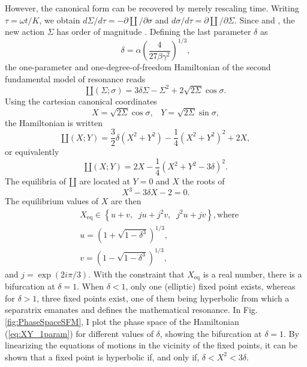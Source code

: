 \documentclass[12pt,a4paper,oneside]{article}
\begin{document}
However, the canonical form can be recovered by merely rescaling time. Writing $\tau=\omega t/K$, we obtain $d\Sigma/d\tau=-\partial\amalg/\partial\sigma$ and $d\sigma/d\tau=\partial\amalg/\partial\Sigma$. Since  and , the new action $\Sigma$ has order of magnitude . Defining the last parameter $\delta$ as
\begin{equation}
	\delta=\alpha\left(\frac{4}{27\beta\gamma^2}\right)^{1/3},
\end{equation}
the one-parameter and one-degree-of-freedom Hamiltonian of the second fundamental model of resonance reads
\begin{equation}\label{eq:SFM_polar}
	\amalg(\Sigma;\sigma)=3\delta\Sigma-\Sigma^2+2\sqrt{2\Sigma}\cos\sigma.
\end{equation}
Using the cartesian canonical coordinates
\begin{equation}
	X=\sqrt{2\Sigma}\cos\sigma,\;\;\;Y=\sqrt{2\Sigma}\sin\sigma,
\end{equation}
the Hamiltonian is written
\begin{equation}\label{eq:XY_1param}
	\amalg(X;Y)=\frac{3}{2}\delta\left(X^2+Y^2\right)-\frac{1}{4}\left(X^2+Y^2\right)^2+2X,
\end{equation}
or equivalently
\begin{equation}
	\amalg(X;Y)=2X-\frac{1}{4}\left(X^2+Y^2-3\delta\right)^2.
\end{equation}
The equilibria of $\amalg$ are located at $Y=0$ and $X$ the roots of
\begin{equation}
	X^3-3\delta X-2=0.
\end{equation}
The equilibrium values of $X$ are then
\begin{equation}
	\begin{split}
		&X_\text{eq}\in\left\lbrace u+v,\;\;ju+j^2v,\;\;j^2u+jv\right\rbrace,\text{where}\\
		&u=\left(1+\sqrt{1-\delta^3}\right)^{1/3},\\
		&v=\left(1-\sqrt{1-\delta^3}\right)^{1/3},
	\end{split}
\end{equation}
and $j=\exp(2i\pi/3)$. With the constraint that $X_\text{eq}$ is a real number, there is a bifurcation at $\delta=1$. When $\delta<1$, only one (elliptic) fixed point exists, whereas for $\delta>1$, three fixed points exist, one of them being hyperbolic from which a separatrix emanates and defines the mathematical resonance. In Fig. \ref{fig:PhaseSpaceSFM}, I plot the phase space of the Hamiltonian (\ref{eq:XY_1param}) for different values of $\delta$, showing the bifurcation at $\delta=1$. By linearizing the equations of motions in the vicinity of the fixed points, it can be shown that a fixed point is hyperbolic if, and only if, $\delta<X^2<3\delta$. 
\end{document}
